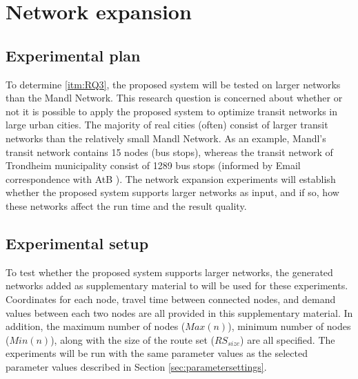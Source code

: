 \section{Network expansion}
\label{sec:networkExpansion}
\subsection{Experimental plan}
To determine \vref{itm:RQ3}, the proposed system will be tested on larger networks than the Mandl Network. This research question is concerned about whether or not it is possible to apply the proposed system to optimize transit networks in large urban cities. The majority of real cities (often) consist of larger transit networks than the relatively small Mandl Network. As an example, Mandl's transit network contains 15 nodes (bus stops), whereas the transit network of Trondheim municipality consist of 1289 bus stops (informed by Email correspondence with AtB \citep{website:atb}). The network expansion experiments will establish whether the proposed system supports larger networks as input, and if so, how these networks affect the run time and the result quality.



\subsection{Experimental setup}
\label{subsec:scalabilityExperiments_setup}

To test whether the proposed system supports larger networks, the generated networks added as supplementary material to \citet{mumford13} will be used for these experiments. Coordinates for each node, travel time between connected nodes, and demand values between each two nodes are all provided in this supplementary material. In addition, the maximum number of nodes ($Max(n)$), minimum number of nodes ($Min(n)$), along with the size of the route set ($RS_{size}$) are all specified. The experiments will be run with the same parameter values as the selected parameter values described in Section \vref{sec:parametersettings}.

